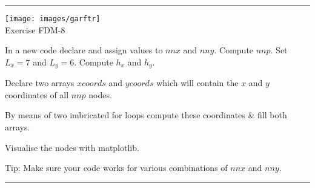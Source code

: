 \begin{center}
\begin{minipage}[t]{0.77\textwidth}
\par\noindent\rule{\textwidth}{0.4pt}

\begin{center}
\texttt{[image: images/garftr]} \\
{\color{orange}Exercise FDM-8}
\end{center}

In a new code declare and assign values to 
$nnx$ and $nny$. Compute $nnp$.
Set $L_x=7$ and $L_y=6$. Compute $h_x$ and $h_y$.

Declare two arrays $xcoords$ and $ycoords$ which will 
contain the $x$ and $y$ coordinates of all $nnp$ nodes.

By means of two imbricated for loops
compute these coordinates \& fill both arrays. 

Visualise the nodes with matplotlib.

Tip: Make sure your code works for various 
combinations of $nnx$ and $nny$.

\par\noindent\rule{\textwidth}{0.4pt}
\end{minipage}
\end{center}






